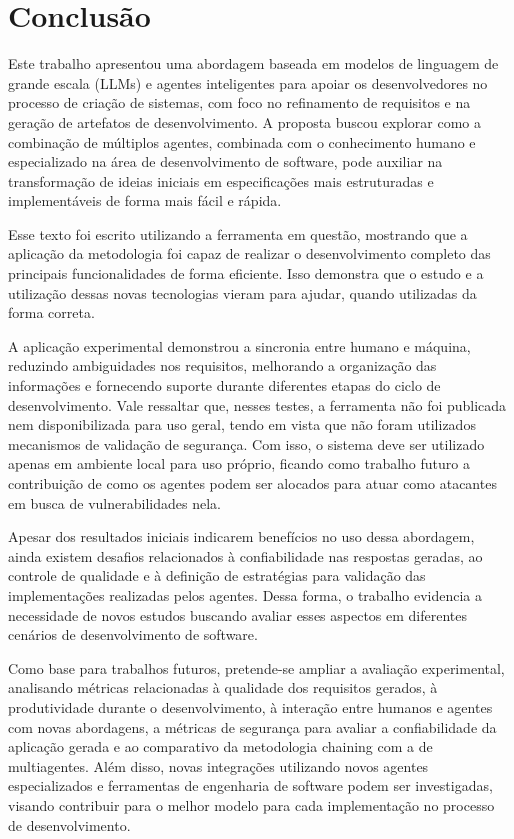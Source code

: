 \section{Conclusão}

Este trabalho apresentou uma abordagem baseada em modelos de linguagem de grande escala (LLMs) e agentes inteligentes para apoiar os desenvolvedores no processo de criação de sistemas, com foco no refinamento de requisitos e na geração de artefatos de desenvolvimento. A proposta buscou explorar como a combinação de múltiplos agentes, combinada com o conhecimento humano e especializado na área de desenvolvimento de software, pode auxiliar na transformação de ideias iniciais em especificações mais estruturadas e implementáveis de forma mais fácil e rápida.

Esse texto foi escrito utilizando a ferramenta em questão, mostrando que a aplicação da metodologia foi capaz de realizar o desenvolvimento completo das principais funcionalidades de forma eficiente. Isso demonstra que o estudo e a utilização dessas novas tecnologias vieram para ajudar, quando utilizadas da forma correta.

A aplicação experimental demonstrou a sincronia entre humano e máquina, reduzindo ambiguidades nos requisitos, melhorando a organização das informações e fornecendo suporte durante diferentes etapas do ciclo de desenvolvimento. Vale ressaltar que, nesses testes, a ferramenta não foi publicada nem disponibilizada para uso geral, tendo em vista que não foram utilizados mecanismos de validação de segurança. Com isso, o sistema deve ser utilizado apenas em ambiente local para uso próprio, ficando como trabalho futuro a contribuição de como os agentes podem ser alocados para atuar como atacantes em busca de vulnerabilidades nela.

Apesar dos resultados iniciais indicarem benefícios no uso dessa abordagem, ainda existem desafios relacionados à confiabilidade nas respostas geradas, ao controle de qualidade e à definição de estratégias para validação das implementações realizadas pelos agentes. Dessa forma, o trabalho evidencia a necessidade de novos estudos buscando avaliar esses aspectos em diferentes cenários de desenvolvimento de software.

Como base para trabalhos futuros, pretende-se ampliar a avaliação experimental, analisando métricas relacionadas à qualidade dos requisitos gerados, à produtividade durante o desenvolvimento, à interação entre humanos e agentes com novas abordagens, a métricas de segurança para avaliar a confiabilidade da aplicação gerada e ao comparativo da metodologia chaining com a de multiagentes. Além disso, novas integrações utilizando novos agentes especializados e ferramentas de engenharia de software podem ser investigadas, visando contribuir para o melhor modelo para cada implementação no processo de desenvolvimento.

